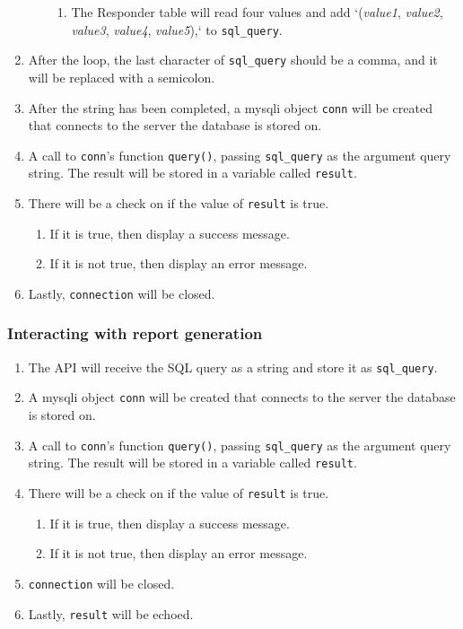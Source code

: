 \documentclass[letterpaper,10pt,serif, draftclsnofoot,onecolumn, compsoc, titlepage]{IEEEtran}
\begin{document}
\begin{enumerate}
\begin{enumerate}
\begin{enumerate}
			\item The Responder table will read four values and add `(\emph{value1}, \emph{value2}, \emph{value3}, \emph{value4}, \emph{value5}),` to \texttt{sql\_query}.
		\end{enumerate}
	\end{enumerate}
	\item After the loop, the last character of \texttt{sql\_query} should be a comma, and it will be replaced with a semicolon.
	\item After the string has been completed, a mysqli object \texttt{conn} will be created that connects to the server the database is stored on.
	\item A call to \texttt{conn}'s function \texttt{query()}, passing \texttt{sql\_query} as the argument query string.
				The result will be stored in a variable called \texttt{result}.
	\item There will be a check on if the value of \texttt{result} is true.
	\begin{enumerate}
		\item If it is true, then display a success message.
		\item If it is not true, then display an error message.
	\end{enumerate}
	\item Lastly, \texttt{connection} will be closed.
\end{enumerate}

\subsubsection{Interacting with report generation}
\begin{enumerate}
	\item The API will receive the SQL query as a string and store it as \texttt{sql\_query}.
	\item A mysqli object \texttt{conn} will be created that connects to the server the database is stored on.
	\item A call to \texttt{conn}'s function \texttt{query()}, passing \texttt{sql\_query} as the argument query string.
				The result will be stored in a variable called \texttt{result}.
	\item There will be a check on if the value of \texttt{result} is true.
	\begin{enumerate}
		\item If it is true, then display a success message.
		\item If it is not true, then display an error message.
	\end{enumerate}
	\item \texttt{connection} will be closed.
	\item Lastly, \texttt{result} will be echoed.
\end{enumerate}
\end{document}
